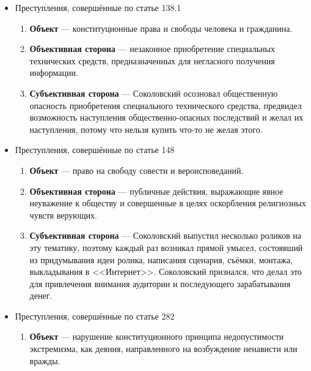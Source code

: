 \documentclass[a4paper]{article}
\begin{document}
		\begin{itemize}
			\item Преступления, совершённые по статье 138.1
			
			\begin{enumerate}
				\item \textbf{Объект} --- конституционные права и свободы человека и гражданина.
				
				\item \textbf{Объективная сторона} --- незаконное приобретение специальных технических средств, предназначенных для негласного получения информации.
				
				\item \textbf{Субъективная сторона} --- Соколовский осозновал общественную опасность приобретения специального технического средства, предвидел возможность наступления общественно-опасных последствий и желал их наступления, потому что нельзя купить что-то не желая этого.
			\end{enumerate}
			
			\item Преступления, совершённые по статье 148
			
			\begin{enumerate}
				\item \textbf{Объект} --- право на свободу совести и вероисповеданий.
				
				\item \textbf{Объективная сторона} ---  публичные действия, выражающие явное неуважение к обществу и совершенные в целях оскорбления религиозных чувств верующих.
				
				\item \textbf{Субъективная сторона} --- Соколовский выпустил несколько роликов на эту тематику, поэтому каждый раз возникал прямой умысел, состоявший из придумывания идеи ролика, написания сценария, съёмки, монтажа, выкладывания в <<Интернет>>. Соколовский признался, что делал это для привлечения внимания аудитории и последующего зарабатывания денег.
			\end{enumerate}
			
			\item Преступления, совершённые по статье 282
			
			\begin{enumerate}
				\item \textbf{Объект} --- нарушение конституционного принципа недопустимости экстремизма, как деяния, направленного на возбуждение ненависти или вражды.
				

\end{enumerate}
\end{itemize}
\end{document}
